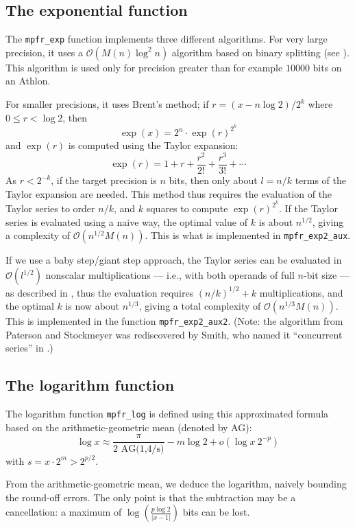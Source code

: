 \documentclass[12pt]{amsart}
\def\O{{\mathcal O}}
\begin{document}
\subsection{The exponential function}

The {\tt mpfr\_exp} function implements three different algorithms.
For very large precision, it uses a $\O(M(n) \log^2 n)$ algorithm
based on binary splitting (see \cite{Jeandel00}).
This algorithm is used only for precision greater
than for example $10000$ bits on an Athlon.

For smaller precisions, it uses Brent's method;
if $r = (x - n \log 2)/2^k$ where $0 \le r < \log 2$, then
\[ \exp(x) = 2^n \cdot \exp(r)^{2^k} \]
and $\exp(r)$ is computed using the Taylor expansion:
\[ \exp(r) =  1 + r + \frac{r^2}{2!} + \frac{r^3}{3!} + \cdots \]
As $r < 2^{-k}$, if the target precision is $n$ bits, then only
about $l = n/k$ terms of the Taylor expansion are needed.
This method thus requires the evaluation of the Taylor series to
order $n/k$, and $k$ squares to compute $\exp(r)^{2^k}$.
If the Taylor series is evaluated using a naive way, the optimal
value of $k$ is about $n^{1/2}$, giving a complexity of $\O(n^{1/2} M(n))$.
This is what is implemented in {\tt mpfr\_exp2\_aux}.

If we use a baby step/giant step approach, the Taylor series
can be evaluated in $\O(l^{1/2})$ nonscalar multiplications 
--- i.e., with both operands of full $n$-bit size --- as described in
\cite{PaSt73},
thus the evaluation requires $(n/k)^{1/2} + k$ multiplications,
and the optimal $k$ is now about $n^{1/3}$,
giving a total complexity of $\O(n^{1/3} M(n))$.
This is implemented in the function {\tt mpfr\_exp2\_aux2}.
(Note: the algorithm from Paterson and Stockmeyer was rediscovered by Smith,
who named it ``concurrent series'' in \cite{Smith91}.)

\subsection{The logarithm function}

The logarithm function \verb!mpfr_log! is defined using this
approximated formula~\cite{Muller97} based on the arithmetic-geometric
mean (denoted by AG):
\[ \log x \approx \frac{\pi}{\mbox{2~AG(1,4/s)}} - m \log 2  + o(\log x ~2^{-p}) \]
with $s = x \cdot 2^m > 2^{p/2}$.

From the arithmetic-geometric mean, we deduce the logarithm, naively
bounding the round-off errors. The only point is that the subtraction
may be a cancellation: a maximum of $\log \left(\frac{p \log
  2}{|x-1|}\right)$ bits can be lost.
\end{document}
